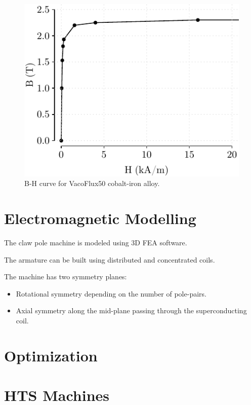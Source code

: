 \documentclass[final,peerreview,onecolumn]{IEEEtran}
\begin{document}
\begin{figure}[t]
  \centering
    \includegraphics[]{vacoflux_50}
  \caption{B-H curve for  VacoFlux50 cobalt-iron alloy\cite{vacoflux}.}
  \label{vacoflux-bh}
\end{figure}



\section{Electromagnetic Modelling}	
The claw pole machine is modeled using 3D FEA software.

The armature can be built using distributed and concentrated coils.

The machine has two symmetry planes:

\begin{itemize}
	\item Rotational symmetry depending on the number of pole-pairs.
	\item Axial symmetry along the mid-plane passing through the superconducting coil.
\end{itemize}

\section{Optimization}







\section{HTS Machines}
\end{document}
